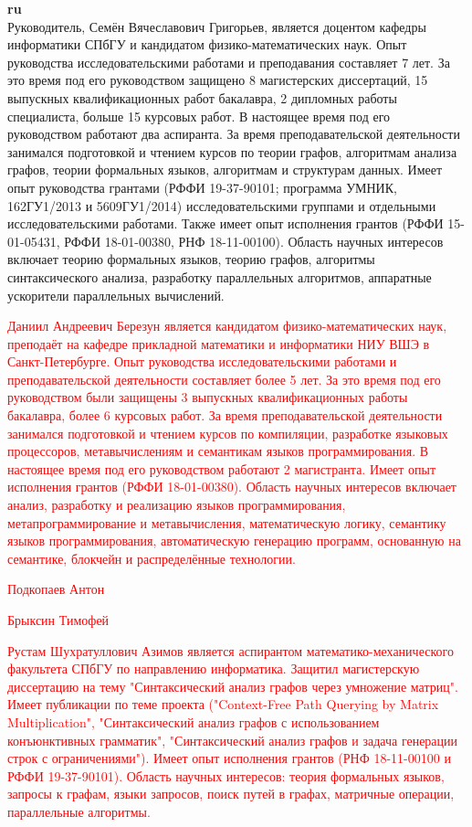 \documentclass[12pt]{article}  %
\theoremstyle{remark}
\newcommand{\checkme}[1]{\textcolor{red}{#1}}
\begin{document}
\textbf{ru}\\
%
Руководитель, Семён Вячеславович Григорьев, является доцентом кафедры информатики СПбГУ и кандидатом физико-математических наук. Опыт руководства исследовательскими работами и преподавания составляет 7 лет. За это время под его руководством защищено 8 магистерских диссертаций, 15 выпускных квалификационных работ бакалавра, 2 дипломных работы специалиста, больше 15 курсовых работ. В настоящее время под его руководством работают два аспиранта. За время преподавательской деятельности занимался подготовкой и чтением курсов по теории графов, алгоритмам анализа графов, теории формальных языков, алгоритмам и структурам данных. Имеет опыт руководства грантами (РФФИ 19-37-90101; программа УМНИК, 162ГУ1/2013 и 5609ГУ1/2014) исследовательскими группами и отдельными исследовательскими работами. Также имеет опыт исполнения грантов (РФФИ 15-01-05431, РФФИ 18-01-00380, РНФ 18-11-00100). Область научных интересов включает теорию формальных языков, теорию графов, алгоритмы синтаксического анализа, разработку параллельных алгоритмов, аппаратные ускорители параллельных вычислений.

\checkme{Даниил Андреевич Березун является кандидатом физико-математических наук, преподаёт на кафедре прикладной математики и информатики НИУ ВШЭ в Санкт-Петербурге. Опыт руководства исследовательскими работами и преподавательской деятельности составляет более 5 лет. За это время под его руководством были защищены 3 выпускных квалификационных работы бакалавра, более 6 курсовых работ. За время преподавательской деятельности занимался подготовкой и чтением курсов по компиляции, разработке языковых процессоров, метавычислениям и семантикам языков программирования. В настоящее время под его руководством работают 2 магистранта. Имеет опыт исполнения грантов (РФФИ 18-01-00380). Область научных интересов включает анализ, разработку и реализацию языков программирования,  метапрограммирование и метавычисления, математическую логику, семантику языков программирования, автоматическую генерацию программ, основанную на семантике, блокчейн и распределённые технологии.}

\checkme{Подкопаев Антон}

\checkme{Брыксин Тимофей}

\checkme{Рустам Шухратуллович Азимов является аспирантом математико-механического факультета СПбГУ по направлению информатика. Защитил магистерскую диссертацию на тему "Синтаксический анализ графов через умножение матриц". Имеет публикации по теме проекта ("Context-Free Path Querying by Matrix Multiplication", "Синтаксический анализ графов с использованием конъюнктивных грамматик", "Синтаксический анализ графов и задача генерации строк с ограничениями"). Имеет опыт исполнения грантов (РНФ 18-11-00100 и РФФИ 19-37-90101). Область научных интересов: теория формальных языков, запросы к графам, языки запросов, поиск путей в графах, матричные операции, параллельные алгоритмы.}
\end{document}
